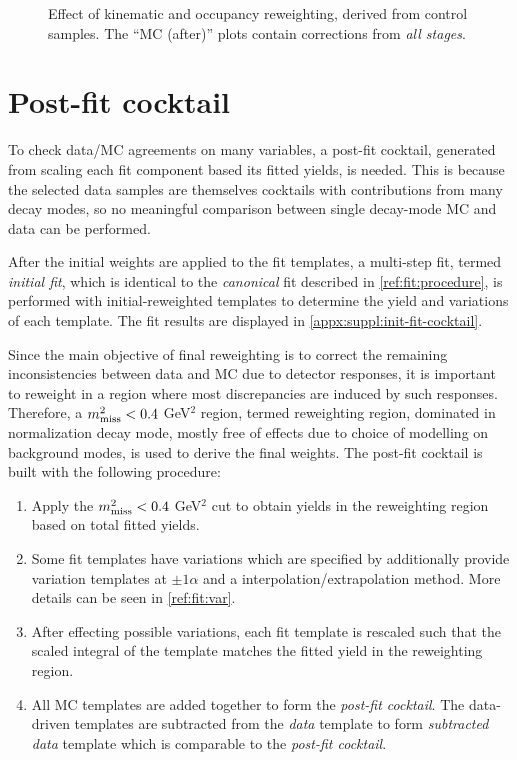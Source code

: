 \begin{figure}[htb]
    \caption{
        Effect of \B kinematic and occupancy reweighting,
        derived from \jpsi\kaon control samples.
        The ``MC (after)'' plots contain corrections from \emph{all stages}.
    }
    \label{fig:rwt-JpsiK}
\end{figure}


\section{Post-fit cocktail}
\label{ref:mc-cor:postfit-cocktail}

To check data/MC agreements on many variables, a post-fit cocktail,
generated from scaling each fit component based its fitted yields, is needed.
This is because the selected data samples are themselves cocktails with
contributions from many decay modes, so no meaningful comparison between single
decay-mode MC and data can be performed.

After the initial weights are applied to the fit templates,
a multi-step fit,
termed \emph{initial fit},
which is identical to the \emph{canonical} fit described in
\cref{ref:fit:procedure},
is performed with initial-reweighted templates to determine the yield and
variations of each template.
The fit results are displayed in
\cref{appx:suppl:init-fit-cocktail}.

Since the main objective of final reweighting is to correct the remaining
inconsistencies between data and MC due to detector responses,
it is important to reweight in a region where most discrepancies are induced by
such responses.
Therefore, a $m^2_\text{miss} < 0.4$ GeV$^2$ region,
termed reweighting region,
dominated in normalization decay mode,
mostly free of effects due to choice of modelling on background modes,
is used to derive the final weights.
The post-fit cocktail is built with the following procedure:

\begin{enumerate}
    \item Apply the $m^2_\text{miss} < 0.4$ GeV$^2$ cut to obtain yields in the reweighting
        region based on total fitted yields.

    \item Some fit templates have variations which are specified by
        additionally provide variation templates at $\pm 1 \alpha$ and a
        interpolation/extrapolation method.
        More details can be seen in \cref{ref:fit:var}.

    \item After effecting possible variations,
        each fit template is rescaled such that the scaled integral of the
        template matches the fitted yield in the reweighting region.

    \item All MC templates are added together to form the
        \emph{post-fit cocktail}.
        The data-driven templates are subtracted from the \emph{data}
        template to form \emph{subtracted data} template
        which is comparable to the \emph{post-fit cocktail}.
\end{enumerate}


